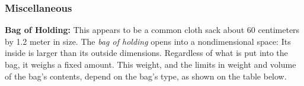 \subsubsection{Miscellaneous}









\textbf{Bag of Holding:} This appears to be a common cloth sack about 60 centimeters by 1.2 meter in size. The \emph{bag of holding} opens into a nondimensional space: Its inside is larger than its outside dimensions. Regardless of what is put into the bag, it weighs a fixed amount. This weight, and the limits in weight and volume of the bag's contents, depend on the bag's type, as shown on the table below.

